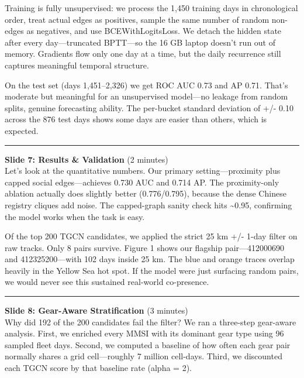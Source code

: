 \documentclass[
]{article}
\begin{document}
Training is fully unsupervised: we process the 1,450 training days in
chronological order, treat actual edges as positives, sample the same
number of random non-edges as negatives, and use BCEWithLogitsLoss. We
detach the hidden state after every day---truncated BPTT---so the 16 GB
laptop doesn't run out of memory. Gradients flow only one day at a time,
but the daily recurrence still captures meaningful temporal structure.

On the test set (days 1,451--2,326) we get ROC AUC 0.73 and AP 0.71.
That's moderate but meaningful for an unsupervised model---no leakage
from random splits, genuine forecasting ability. The per-bucket standard
deviation of +/- 0.10 across the 876 test days shows some days are
easier than others, which is expected.

\begin{center}\rule{0.5\linewidth}{0.5pt}\end{center}

\textbf{Slide 7: Results \& Validation} (2 minutes)\\
Let's look at the quantitative numbers. Our primary setting---proximity
plus capped social edges---achieves 0.730 AUC and 0.714 AP. The
proximity-only ablation actually does slightly better (0.776/0.795),
because the dense Chinese registry cliques add noise. The capped-graph
sanity check hits \textasciitilde0.95, confirming the model works when
the task is easy.

Of the top 200 TGCN candidates, we applied the strict 25 km +/- 1-day
filter on raw tracks. Only 8 pairs survive. Figure 1 shows our flagship
pair---412000690 and 412325200---with 102 days inside 25 km. The blue
and orange traces overlap heavily in the Yellow Sea hot spot. If the
model were just surfacing random pairs, we would never see this
sustained real-world co-presence.

\begin{center}\rule{0.5\linewidth}{0.5pt}\end{center}

\textbf{Slide 8: Gear-Aware Stratification} (3 minutes)\\
Why did 192 of the 200 candidates fail the filter? We ran a three-step
gear-aware analysis. First, we enriched every MMSI with its dominant
gear type using 96 sampled fleet days. Second, we computed a baseline of
how often each gear pair normally shares a grid cell---roughly 7 million
cell-days. Third, we discounted each TGCN score by that baseline rate
(alpha = 2).
\end{document}
